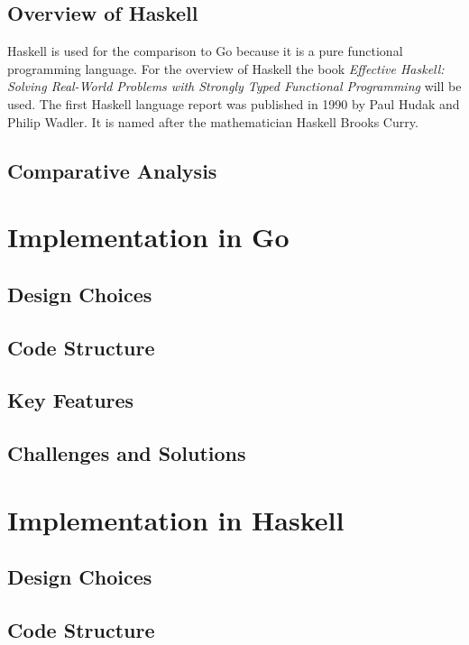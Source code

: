     \section{Overview of Haskell}\label{sec:haskell-overview}
Haskell is used for the comparison to Go because it is a pure functional programming language.
For the overview of Haskell the book \textit{Effective Haskell: Solving Real-World Problems with Strongly Typed Functional Programming} \cite{Skinner} will be used.
The first Haskell language report was published in 1990 by Paul Hudak and Philip Wadler. It is named after the mathematician Haskell Brooks Curry.\cite{Hudak2007}

    \section{Comparative Analysis}\label{sec:comparative-analysis}

\chapter{Implementation in Go}\label{chap:implementation-go}
    \section{Design Choices}\label{sec:design-go}
    \section{Code Structure}\label{sec:code-structure-go}
    \section{Key Features}\label{sec:key-features-go}
    \section{Challenges and Solutions}\label{sec:challenges-go}

\chapter{Implementation in Haskell}\label{chap:implementation-haskell}
    \section{Design Choices}\label{sec:design-haskell}
    \section{Code Structure}\label{sec:code-structure-haskell}
